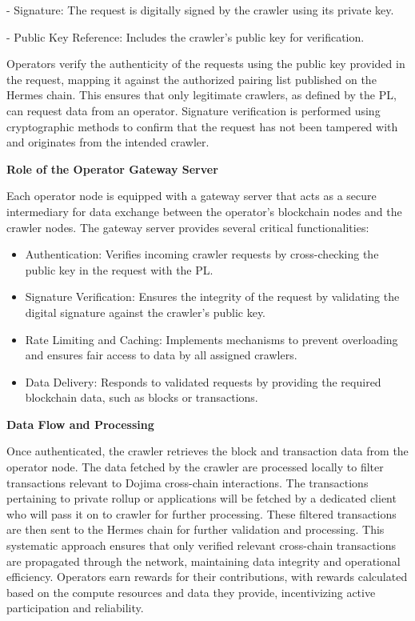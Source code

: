 - Signature: The request is digitally signed by the crawler using its private key.  

- Public Key Reference: Includes the crawler’s public key for verification.  

Operators verify the authenticity of the requests using the public key provided in the request, mapping it against the authorized pairing list published on the Hermes chain. This ensures that only legitimate crawlers, as defined by the PL, can request data from an operator. Signature verification is performed using cryptographic methods to confirm that the request has not been tampered with and originates from the intended crawler.

\textbf{Role of the Operator Gateway Server}

Each operator node is equipped with a gateway server that acts as a secure intermediary for data exchange between the operator’s blockchain nodes and the crawler nodes. The gateway server provides several critical functionalities:  
\begin{itemize}
    \item Authentication: Verifies incoming crawler requests by cross-checking the public key in the request with the PL.  

    \item Signature Verification: Ensures the integrity of the request by validating the digital signature against the crawler’s public key.  

    \item Rate Limiting and Caching: Implements mechanisms to prevent overloading and ensures fair access to data by all assigned crawlers.  

    \item Data Delivery: Responds to validated requests by providing the required blockchain data, such as blocks or transactions.
\end{itemize}

\textbf{Data Flow and Processing}

Once authenticated, the crawler retrieves the block and transaction data from the operator node. The data fetched by the crawler are processed locally to filter transactions relevant to Dojima cross-chain interactions. The transactions pertaining to private rollup or applications will be fetched by a dedicated client who will pass it on to crawler for further processing. These filtered transactions are then sent to the Hermes chain for further validation and processing. This systematic approach ensures that only verified relevant cross-chain transactions are propagated through the network, maintaining data integrity and operational efficiency. Operators earn rewards for their contributions, with rewards calculated based on the compute resources and data they provide, incentivizing active participation and reliability.

